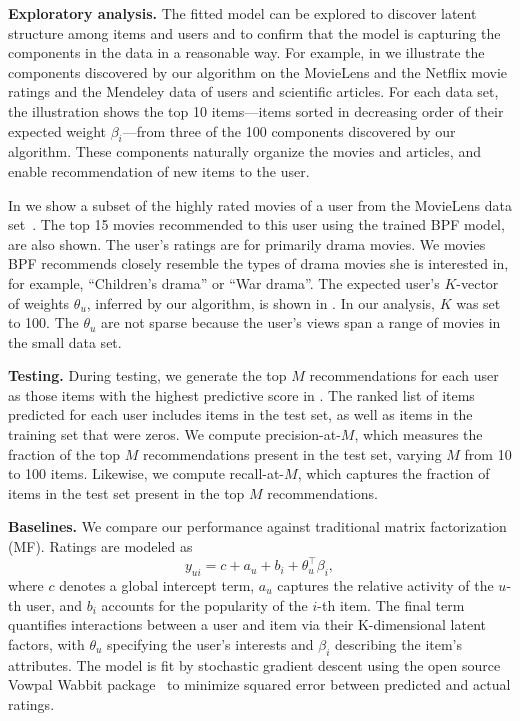 {\bf Exploratory analysis.} The fitted model can be explored to
discover latent structure among items and users and to confirm that
the model is capturing the components in the data in a reasonable
way. For example, in  we illustrate the components
discovered by our algorithm on the MovieLens and the Netflix movie
ratings and the Mendeley data of users and scientific articles. For
each data set, the illustration shows the top 10 items---items sorted
in decreasing order of their expected weight $\beta_i$---from three of
the 100 components discovered by our algorithm. These components
naturally organize the movies and articles, and enable recommendation
of new items to the user.

In  we show a subset of the highly rated
movies of a user from the MovieLens data
set~\cite{Herlocker:1999}. The top 15 movies recommended to this user
using the trained BPF model, are also shown. The user's ratings are
for primarily drama movies. We movies BPF recommends closely resemble
the types of drama movies she is interested in, for example,
``Children's drama'' or ``War drama''. The expected user's $K$-vector
of weights $\theta_u$, inferred by our algorithm, is shown in
. In our analysis, $K$ was set to
100. The $\theta_u$ are not sparse because the user's views span a
range of movies in the small data set.

{\bf Testing.} During testing, we generate the top $M$ recommendations
for each user as those items with the highest predictive score in
. The ranked list of items predicted for each user
includes items in the test set, as well as items in the training set
that were zeros. We compute precision-at-$M$, which measures the
fraction of the top $M$ recommendations present in the test set,
varying $M$ from 10 to 100 items. Likewise, we compute recall-at-$M$,
which captures the fraction of items in the test set present in the
top $M$ recommendations.



{\bf Baselines.} We compare our performance against traditional matrix
factorization (MF). Ratings are modeled as
\begin{equation*}
  y_{ui} = c + a_u + b_i + \theta_u^\top \beta_i,
\end{equation*}
where $c$ denotes a global intercept term, $a_u$ captures the relative
activity of the $u$-th user, and $b_i$ accounts for the popularity of
the $i$-th item. The final term quantifies interactions between a user
and item via their K-dimensional latent factors, with $\theta_u$ specifying
the user's interests and $\beta_i$ describing the item's attributes. The
model is fit by stochastic gradient descent using the open source
Vowpal Wabbit package~\cite{Weinberger:2009} to minimize squared error
between predicted and actual ratings.

